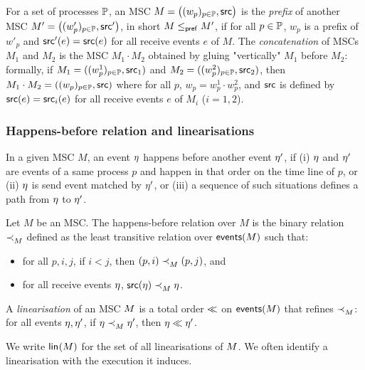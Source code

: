 For a set of processes $\mathbb{P}$, 
an MSC $M=\big((w_p)_{p\in\mathbb{P}},\mathsf{src}\big)$ is the \emph{prefix} 
of another MSC $M'=\big((w'_p)_{p\in\mathbb{P}},\mathsf{src}'\big)$, in short $M \mathrel{\leq_{\mathsf{pref}}} M'$,
if for all $p\in\mathbb{P}$, $w_p$ is a prefix of $w'_p$ and $\mathsf{src}'(e)=\mathsf{src}(e)$ for all receive events $e$ of $M$.
The \emph{concatenation} of MSCs $M_1$ and $M_2$ is the MSC  $M_1\cdot M_2$ 
obtained by gluing "vertically"  $M_1$ before $M_2$:
formally, if $M_1=((w_p^1)_{p\in\mathbb{P}},\mathsf{src}_1)$ and $M_2=((w_p^2)_{p\in\mathbb{P}},\mathsf{src}_2)$, 
then $M_1\cdot M_2=((w_p)_{p\in\mathbb{P}},\mathsf{src})$ where
    for all $p$, $w_p=w_p^1\cdot w_p^2$, and
    $\mathsf{src}$ is defined by $\mathsf{src}(e) = \mathsf{src}_i(e)$ for all receive events $e$ of $M_i$ ($i=1,2$).

\subsubsection*{Happens-before relation and linearisations}
In a given MSC $M$,
an event $\eta$ happens before  
another event $\eta'$, if 
(i) $\eta$ and $\eta'$ are events
of a same process $p$ and happen in that order on 
the time line of $p$,
or (ii) $\eta$ is send event matched by $\eta'$,
or (iii) a sequence of such situations defines
a path from $\eta$ to $\eta'$.

\begin{definition}
Let $M$ be an MSC. The happens-before relation over $M$
is the binary relation $\mathrel{\prec_{M}^{}}$ defined as 
the least transitive relation over $\mathsf{events}(M)$ such that:
\begin{itemize}
   \item 
   for all 
   $p,i,j$, if $i<j$, then $(p,i)\mathrel{\prec_{M}^{}} (p,j)$, and
   \item 
   for all receive events $\eta$, $\mathsf{src}(\eta) \mathrel{\prec_{M}^{}} \eta$.
\end{itemize}
\end{definition}

\begin{definition}[Linearisation]
	\label{def:linearisation}
	A \emph{linearisation} of an MSC $M$ is a
total order $\mathrel{\ll}$ on $\mathsf{events}(M)$
	that refines $\mathrel{\prec_{M}^{}}$:  for all events $\eta,\eta'$, 
	if $\eta\mathrel{\prec_{M}^{}} \eta'$, then $\eta\mathrel{\ll} \eta'$. 
\end{definition}
We write $\mathsf{lin}_{}(M)$ for the set of all linearisations of $M$.
We often identify a linearisation
with the execution it induces. 

